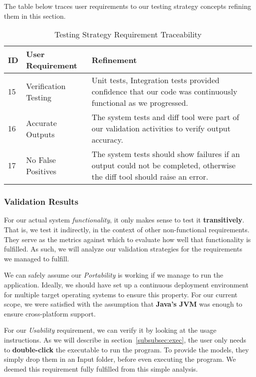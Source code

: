 The table below traces user requirements to our testing strategy concepts refining them in this section.
\begin{table}[htbp]
    \centering
    \caption{Testing Strategy Requirement Traceability}\label{tab:test-strat-table}
    \begin{tabularx}{\textwidth}{| l | l | X |}
        \hline
        \textbf{ID} & \textbf{User Requirement} & \textbf{Refinement} \\
        \hline
        15 & Verification Testing & Unit tests, Integration tests provided confidence that our code was continuously functional as we progressed. \\ \hline
        16 & Accurate Outputs & The system tests and diff tool were part of our validation activities to verify output accuracy. \\ \hline
        17 & No False Positives & The system tests should show failures if an output could not be completed, otherwise the diff tool should raise an error. \\ \hline
    \end{tabularx}
\end{table}
\newpage
\subsubsection{Validation Results}\label{subsubsec:test-validation}
For our actual system \textit{functionality}, it only makes sense to test it \textbf{transitively}.
That is, we test it indirectly, in the context of other non-functional requirements.
They serve as the metrics against which to evaluate how well that functionality is fulfilled.
As such, we will analyze our validation strategies for the requirements we managed to fulfill.

We can safely assume our \textit{Portability} is working if we manage to run the application.
Ideally, we should have set up a continuous deployment environment for multiple target operating systems to ensure this property.
For our current scope, we were satisfied with the assumption that
\textbf{Java's JVM} was enough to ensure cross-platform support.

For our \textit{Usability} requirement, we can verify it by looking at the usage instructions.
As we will describe in section~\ref{subsubsec:exec}, the user only needs to \textbf{double-click} the executable to run the program.
To provide the models, they simply drop them in an Input folder, before even executing the program.
We deemed this requirement fully fulfilled from this simple analysis.

